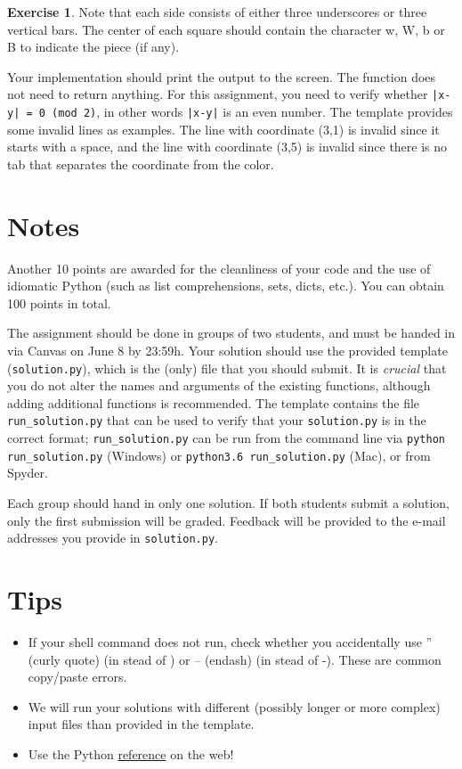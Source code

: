 \documentclass[a4paper]{report}
\theoremstyle{definition}
\newtheorem{exercise}{Exercise}
\begin{document}
\begin{exercise}
	\noindent Note that each side consists of either three underscores or three vertical bars. The center of each square should contain the character w, W, b or B to indicate the piece (if any).
		
	Your implementation should print the output to the screen. The function does not need to return anything. For this assignment, you need to verify whether \texttt{|x-y| = 0 (mod 2)}, in other words \texttt{|x-y|} is an even number. The template provides some invalid
	lines as examples. The line with coordinate (3,1) is invalid since it starts with a space, and the line with coordinate (3,5) is invalid	since there is no tab that separates the coordinate from the color.
\end{exercise}

\section*{Notes}
Another 10 points are awarded for the cleanliness of your code and the use of idiomatic Python (such as list comprehensions, sets, dicts,
etc.). You can obtain 100 points in total.

The assignment should be done in groups of two students, and must be handed in
via Canvas on June 8 by 23:59h.
Your solution should use the provided template (\texttt{solution.py}), which is the (only) file that you should submit. It is \emph{crucial} that you do not alter the names and arguments of the existing functions, although adding additional functions is recommended. The template contains the file \texttt{run\_solution.py} that can be used to verify that your \texttt{solution.py} is in the correct format; \texttt{run\_solution.py} can be run from the command line via \texttt{python run\_solution.py} (Windows) or \texttt{python3.6 run\_solution.py} (Mac), or from Spyder.

Each group should hand in only one solution. If both students submit a solution, only the first submission will be graded. Feedback will be provided to the e-mail addresses you provide in \texttt{solution.py}.

\section*{Tips}

\begin{itemize}
	\setlength\itemsep{1mm}
	\item If your shell command does not run, check whether you
	accidentally use ” (curly quote) (in stead of \textquotedbl{}) or –
	(endash) (in stead of -). These are common copy/paste errors.
	\item We will run your solutions with different (possibly longer or more complex) input files than provided in the template.
	\item Use the Python \href{https://docs.python.org/3/}{reference} on the web!
\end{itemize}
\end{document}
